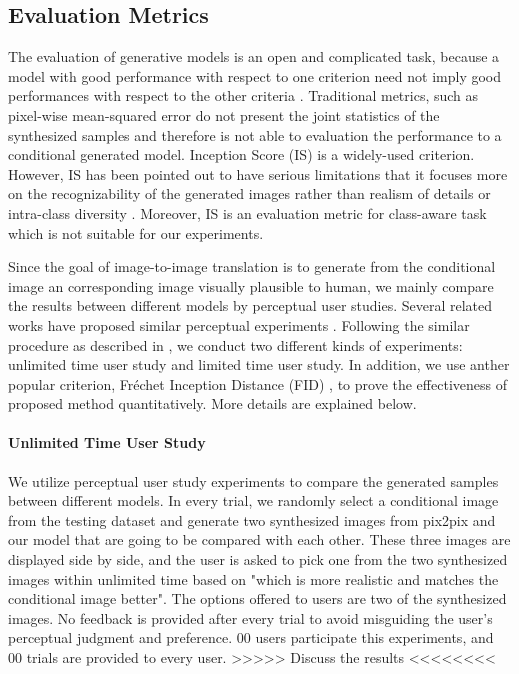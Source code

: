 %
%
\subsection{ Evaluation Metrics}
The evaluation of generative models is an open and complicated task, because a model with good performance with respect to one criterion need not imply good performances with respect to the other criteria \cite{evaluation, GANs_equal}. Traditional metrics, such as pixel-wise mean-squared error do not present the joint statistics of the synthesized samples and therefore is not able to evaluation the performance to a conditional generated model. 
Inception Score (IS) \cite{IS} is a widely-used criterion. However, IS has been pointed out to have serious limitations that it focuses more on the recognizability of the generated images rather than realism of details or intra-class diversity \cite{evaluation}. Moreover, IS is an evaluation metric for class-aware task which is not suitable for our experiments.
 
Since the goal of image-to-image translation is to generate from the conditional image an corresponding image visually plausible to human, we mainly compare the results between different models by perceptual user studies. Several related works have proposed similar perceptual experiments \cite{LaplaceGANs, SRGANs, Improved_techniques, CRN, pix2pixHD}. Following the similar procedure as described in \cite{CRN}, we conduct two different kinds of experiments: unlimited time user study and limited time user study. 
In addition, we use anther popular criterion, Fr\'echet Inception Distance (FID) \cite{FID}, to prove the effectiveness of proposed method quantitatively. More details are explained below.
\paragraph{Unlimited Time User Study}
We utilize perceptual user study experiments to compare the generated samples between different models. In every trial, we randomly select a conditional image from the testing dataset and generate two synthesized images from pix2pix and our model that are going to be compared with each other. These three images are displayed side by side, and the user is asked to pick one from the two synthesized images within unlimited time based on "which is more realistic and matches the conditional image better". The options offered to users are two of the synthesized images. No feedback is provided after every trial to avoid misguiding the user's perceptual judgment and preference. 00 users participate this experiments, and 00 trials are provided to every user.
>>>>> Discuss the results <<<<<<<< 
